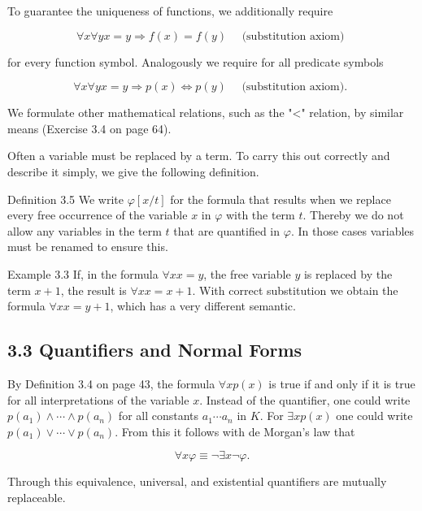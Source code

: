 \documentclass[10pt]{article}
\begin{document}
To guarantee the uniqueness of functions, we additionally require


\begin{equation*}
\forall x \forall y x=y \Rightarrow f(x)=f(y) \quad \text { (substitution axiom) } \tag{3.2}
\end{equation*}


for every function symbol. Analogously we require for all predicate symbols


\begin{equation*}
\forall x \forall y x=y \Rightarrow p(x) \Leftrightarrow p(y) \quad \text { (substitution axiom). } \tag{3.3}
\end{equation*}


We formulate other mathematical relations, such as the "<" relation, by similar means (Exercise 3.4 on page 64).

Often a variable must be replaced by a term. To carry this out correctly and describe it simply, we give the following definition.

Definition 3.5 We write $\varphi[x / t]$ for the formula that results when we replace every free occurrence of the variable $x$ in $\varphi$ with the term $t$. Thereby we do not allow any variables in the term $t$ that are quantified in $\varphi$. In those cases variables must be renamed to ensure this.

Example 3.3 If, in the formula $\forall x x=y$, the free variable $y$ is replaced by the term $x+1$, the result is $\forall x x=x+1$. With correct substitution we obtain the formula $\forall x x=y+1$, which has a very different semantic.

\subsection*{3.3 Quantifiers and Normal Forms}
By Definition 3.4 on page 43, the formula $\forall x p(x)$ is true if and only if it is true for all interpretations of the variable $x$. Instead of the quantifier, one could write $p\left(a_{1}\right) \wedge \cdots \wedge p\left(a_{n}\right)$ for all constants $a_{1} \cdots a_{n}$ in $K$. For $\exists x p(x)$ one could write $p\left(a_{1}\right) \vee \cdots \vee p\left(a_{n}\right)$. From this it follows with de Morgan's law that

$$
\forall x \varphi \equiv \neg \exists x \neg \varphi .
$$

Through this equivalence, universal, and existential quantifiers are mutually replaceable.
\end{document}
